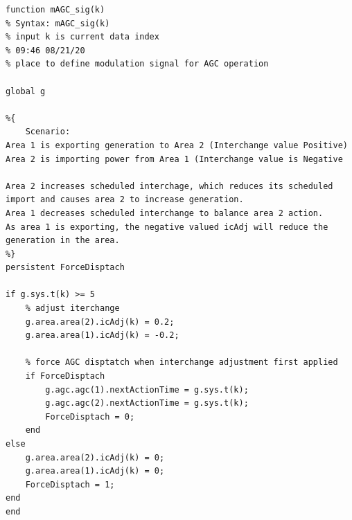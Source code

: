 \begin{lstlisting}[caption={AGC Modulation Example},label={lst: agc mod def}]
\end{lstlisting}\vspace{-2 em}
\begin{verbatim}
function mAGC_sig(k)
% Syntax: mAGC_sig(k)
% input k is current data index
% 09:46 08/21/20
% place to define modulation signal for AGC operation

global g

%{
    Scenario:
Area 1 is exporting generation to Area 2 (Interchange value Positive)
Area 2 is importing power from Area 1 (Interchange value is Negative

Area 2 increases scheduled interchage, which reduces its scheduled import and causes area 2 to increase generation.
Area 1 decreases scheduled interchange to balance area 2 action.
As area 1 is exporting, the negative valued icAdj will reduce the generation in the area.
%}
persistent ForceDisptach

if g.sys.t(k) >= 5
    % adjust iterchange 
    g.area.area(2).icAdj(k) = 0.2;
    g.area.area(1).icAdj(k) = -0.2;
    
    % force AGC disptatch when interchange adjustment first applied
    if ForceDisptach
        g.agc.agc(1).nextActionTime = g.sys.t(k);
        g.agc.agc(2).nextActionTime = g.sys.t(k);
        ForceDisptach = 0;
    end 
else
    g.area.area(2).icAdj(k) = 0;
    g.area.area(1).icAdj(k) = 0;
    ForceDisptach = 1;
end
end
\end{verbatim}

